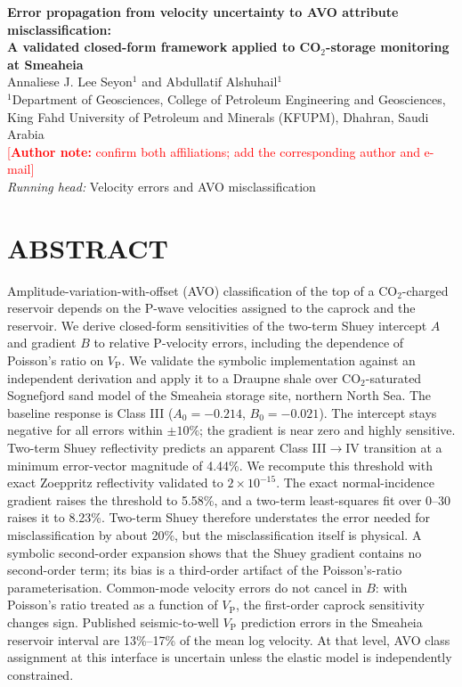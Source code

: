 \documentclass[11pt]{article}
\newcommand{\authornote}[1]{\textcolor{red}{[\textbf{Author note:} #1]}}
\newcommand{\VP}{V_\mathrm{P}}
\begin{document}
\begin{center}
{\large\bfseries Error propagation from velocity uncertainty to AVO attribute misclassification:\\
A validated closed-form framework applied to CO$_2$-storage monitoring at Smeaheia}\\[1.5em]
Annaliese J. Lee Seyon$^{1}$ and Abdullatif Alshuhail$^{1}$\\[0.5em]
{\small $^{1}$Department of Geosciences, College of Petroleum Engineering and Geosciences,\\
King Fahd University of Petroleum and Minerals (KFUPM), Dhahran, Saudi Arabia}\\[0.5em]
\authornote{confirm both affiliations; add the corresponding author and e-mail}\\[1em]
\textit{Running head:} Velocity errors and AVO misclassification
\end{center}

\section*{ABSTRACT}
Amplitude-variation-with-offset (AVO) classification of the top of a CO$_2$-charged reservoir depends on the P-wave velocities assigned to the caprock and the reservoir. We derive closed-form sensitivities of the two-term Shuey intercept $A$ and gradient $B$ to relative P-velocity errors, including the dependence of Poisson's ratio on $\VP$. We validate the symbolic implementation against an independent derivation and apply it to a Draupne shale over CO$_2$-saturated Sognefjord sand model of the Smeaheia storage site, northern North Sea. The baseline response is Class III ($A_0=-0.214$, $B_0=-0.021$). The intercept stays negative for all errors within $\pm10\%$; the gradient is near zero and highly sensitive. Two-term Shuey reflectivity predicts an apparent Class III$\to$IV transition at a minimum error-vector magnitude of 4.44\%. We recompute this threshold with exact Zoeppritz reflectivity validated to $2\times10^{-15}$. The exact normal-incidence gradient raises the threshold to 5.58\%, and a two-term least-squares fit over 0\textdegree--30\textdegree{} raises it to 8.23\%. Two-term Shuey therefore understates the error needed for misclassification by about 20\%, but the misclassification itself is physical. A symbolic second-order expansion shows that the Shuey gradient contains no second-order term; its bias is a third-order artifact of the Poisson's-ratio parameterisation. Common-mode velocity errors do not cancel in $B$: with Poisson's ratio treated as a function of $\VP$, the first-order caprock sensitivity changes sign. Published seismic-to-well $\VP$ prediction errors in the Smeaheia reservoir interval are 13\%--17\% of the mean log velocity. At that level, AVO class assignment at this interface is uncertain unless the elastic model is independently constrained.
\end{document}
